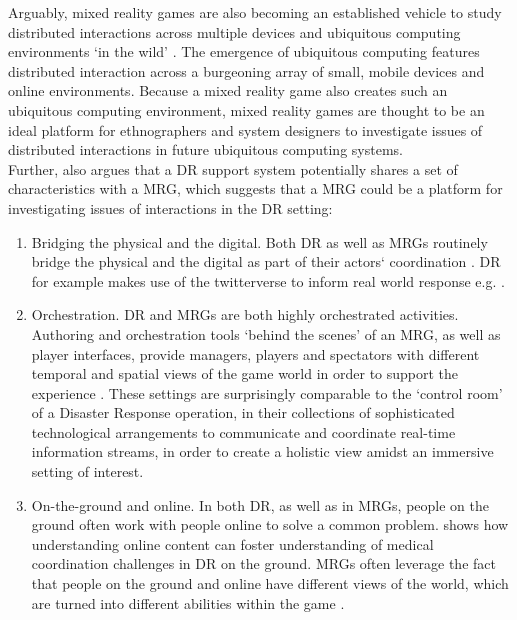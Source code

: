 Arguably, mixed reality games are also becoming an established vehicle to study distributed interactions across multiple devices and ubiquitous computing environments `in the wild' \citep{Crabtree2006, Benford2005, Fischer2012}. The emergence of ubiquitous computing features distributed interaction across a burgeoning array of small, mobile devices and online environments. Because a mixed reality game also creates such an ubiquitous computing environment,  mixed reality games are thought to be an ideal platform for ethnographers and system designers to investigate issues of distributed interactions in future ubiquitous computing systems.\\

Further, \cite{Fischer2012} also argues that a \ac{DR} support system potentially shares a set of characteristics with a \ac{MRG}, which suggests that a \ac{MRG} could be a platform for investigating issues of interactions in the \ac{DR} setting:\\

\begin{enumerate}
\item Bridging the physical and the digital. Both \ac{DR} as well as \ac{MRG}s routinely bridge the physical and the digital as part of their actors` coordination \citep{Benford2005}. \ac{DR} for example makes use of the twitterverse to inform real world response e.g. \citep{Sarcevic2012}.

\item Orchestration. \ac{DR} and \ac{MRG}s are both highly orchestrated activities. Authoring and orchestration tools `behind the scenes' of an \ac{MRG}, as well as player interfaces, provide managers, players and spectators with different temporal and spatial views of the game world in order to support the experience \citep{Crabtree2004}. These settings are surprisingly comparable to the `control room' of a Disaster Response operation, in their collections of sophisticated technological arrangements to communicate and coordinate real-time information streams, in order to create a holistic view amidst an immersive setting of interest.\\

\item On-the-ground and online. In both \ac{DR}, as well as in \ac{MRG}s, people on the ground often work with people online to solve a common problem. \cite{Sarcevic2012} shows how understanding online content can foster understanding of medical coordination challenges in \ac{DR} on the ground. \ac{MRG}s often leverage the fact that people on the ground and online have different views of the world, which are turned into different abilities within the game \citep{Flintham2003}.\\ 

\end{enumerate}

